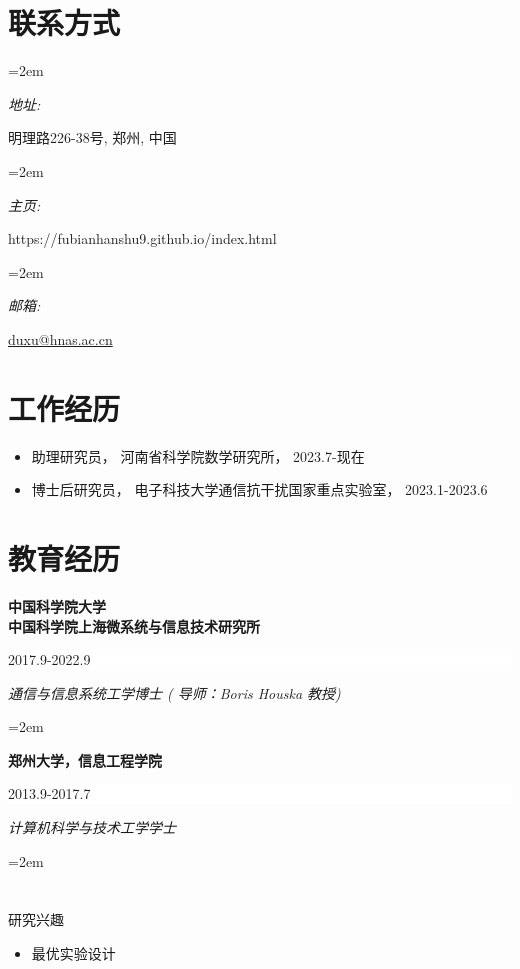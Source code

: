 \documentclass[paper=a4,fontsize=11pt]{scrartcl} %
\newlength{\spacebox}
\newcommand{\sepspace}{\vspace*{1em}}		%
\newcommand{\MyName}[1]{ %
		\Huge \usefont{OT1}{phv}{b}{n} \hfill #1
		\par \normalsize \normalfont}
\newcommand{\MySlogan}[1]{ %
		\large \usefont{OT1}{phv}{m}{n}\hfill \textit{#1}
		\par \normalsize \normalfont}
\newcommand{\NewPart}[1]{\section*{\uppercase{#1}}}
\newcommand{\PersonalEntry}[2]{
		\noindent\hangindent=2em\hangafter=0 %
		\parbox{\spacebox}{        %
		\textit{#1}}		       %
		\hspace{1.5em} #2 \par}    %
\newcommand{\EducationEntry}[4]{
		\noindent \textbf{#1} \hfill      %
		\colorbox{White}{%
			\parbox{5cm}{%
			\hfill\color{Black}#2}} \par  %
		\noindent \textit{#3} \par        %
		\noindent\hangindent=2em\hangafter=0 \small #4 %
		\normalsize \par}
\begin{document}
		\begin{CJK*}{UTF8}{gbsn}
{
	\par \normalsize \normalfont}


\NewPart{联系方式}{}

\PersonalEntry{地址:}{明理路226-38号, 郑州, 中国}
\PersonalEntry{主页:}{https://fubianhanshu9.github.io/index.html}
\PersonalEntry{邮箱:}{\url{duxu@hnas.ac.cn}}%

\NewPart{工作经历}
\begin{itemize}
	\item 助理研究员， 河南省科学院数学研究所， 2023.7-现在
	
	\item 博士后研究员， 电子科技大学通信抗干扰国家重点实验室， 2023.1-2023.6
\end{itemize}

\NewPart{教育经历}{}

\EducationEntry{中国科学院大学\\中国科学院上海微系统与信息技术研究所}{2017.9-2022.9}{通信与信息系统工学博士 ( 导师：Boris Houska 教授) }

\sepspace

\EducationEntry{郑州大学，信息工程学院}{2013.9-2017.7}{计算机科学与技术工学学士 }

\NewPart{研究兴趣}{}
\begin{itemize}
	\item{最优实验设计}
	

\end{itemize}
\end{CJK*}
\end{document}
